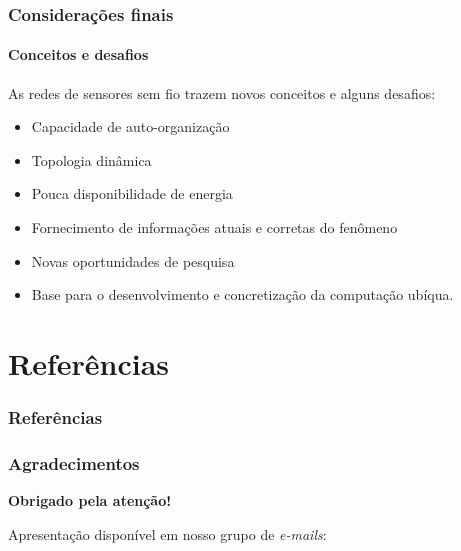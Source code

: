 \documentclass[notes]{beamer}
\begin{document}
\begin{frame}
\frametitle{Considerações finais}
\framesubtitle{Conceitos e desafios}

\begin{block}

As redes de sensores sem fio trazem novos conceitos e alguns desafios: \pause

\begin{itemize}


\item Capacidade de auto-organização \pause
\item Topologia dinâmica \pause
\item Pouca disponibilidade de energia \pause
\item Fornecimento de informações atuais e corretas do fenômeno \pause

\end{itemize}

\end{block}

\begin{exampleblock} 

\begin{itemize}

\item Novas oportunidades de pesquisa \pause
\item Base para o desenvolvimento e concretização da computação ubíqua.

\end{itemize}

\end{exampleblock}

\end{frame}

\section{Referências}
\begin{frame}
\frametitle{Referências}




\end{frame}

\begin{frame}
\frametitle{Agradecimentos}
\vskip20pt

\begin{center}
{\bf \color{alert} Obrigado pela atenção!}
\end{center}

\vskip20pt

\begin{center}
Apresentação disponível em nosso grupo de \textit{e-mails}:\\
\vskip12pt
\end{center}

\titlepage
\end{frame}
\end{document}
